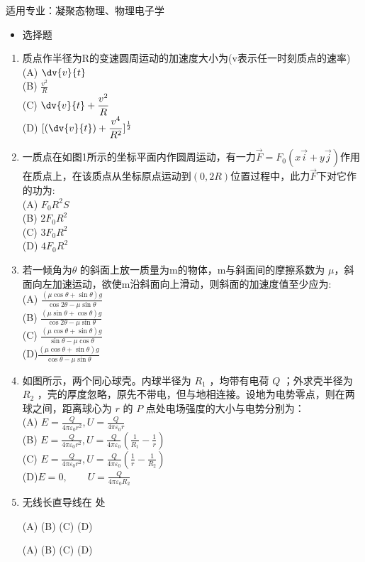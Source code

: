 适用专业：凝聚态物理、物理电子学
\begin{itemize}
\item 选择题
\end{itemize}
\begin{enumerate}
\item 质点作半径为R的变速圆周运动的加速度大小为(v表示任一时刻质点的速率)\\
(A) $\displaystyle \dv{v}{t}$\\
(B) $\displaystyle \frac{v^2}{R}$\\
(C) $\displaystyle \dv{v}{t}+\frac{v^2}{R}$\\
(D) $\displaystyle [(\dv{v}{t})+\frac{v^4}{R^2}]^\frac{1}{2}$
\item 一质点在如图1所示的坐标平面内作圆周运动，有一力$\vec F=F_0(x\vec i+y \vec j)$作用在质点上，在该质点从坐标原点运动到$(0,2R)$位置过程中，此力$\vec F$下对它作的功为:\\
(A) $F_0R^2S$\\
(B) $2F_0R^2$\\
(C) $3F_0R^2$\\
(D) $4F_0R^2$
\item 若一倾角为$\theta$ 的斜面上放一质量为m的物体，m与斜面间的摩擦系数为 $\mu$，斜面向左加速运动，欲使m沿斜面向上滑动，则斜面的加速度值至少应为:\\
(A) $\displaystyle \frac{(\mu \cos \theta+\sin \theta)g}{\cos 2\theta -\mu \sin \theta}$\\
(B) $\displaystyle\frac{(\mu \sin \theta+\cos \theta)g}{\cos 2\theta -\mu \sin \theta}$\\
(C) $\displaystyle \frac{(\mu \cos \theta+\sin \theta)g}{\sin \theta -\mu \cos\theta}$\\
(D)$\displaystyle \frac{(\mu \cos \theta+\sin \theta)g}{\cos \theta -\mu \sin\theta}$
\item 如图所示，两个同心球壳。内球半径为 $R_1$ ，均带有电荷 $Q$ ；外求壳半径为 $R_2$ ，壳的厚度忽略，原先不带电，但与地相连接。设地为电势零点，则在两球之间，距离球心为 $r$ 的 $P$ 点处电场强度的大小与电势分别为：\\
(A) $\displaystyle E=\frac{Q}{4\pi\varepsilon_0 r^2},U=\frac{Q}{4\pi\varepsilon_0 r}$\\
(B) $\displaystyle E=\frac{Q}{4\pi\varepsilon_0 r^2},U=\frac{Q}{4\pi\varepsilon_0} (\frac{1}{R_1}-\frac{1}{r})$\\
(C) $\displaystyle E=\frac{Q}{4\pi\varepsilon_0 r^2},U=\frac{Q}{4\pi\varepsilon_0} (\frac{1}{r}-\frac{1}{R_2}) $\\
(D)$\displaystyle E=0,\qquad U=\frac{Q}{4 \pi \varepsilon_0 R_2}$
\item 无线长直导线在  处

(A)
(B)
(C)
(D)


(A)
(B)
(C)
(D)
\end{enumerate}
